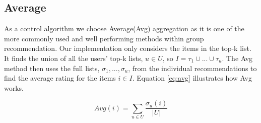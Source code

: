 \subsection{Average}\label{sec:average}
As a control algorithm we choose Average(Avg) aggregation as it is one of the more commonly used and well performing methods within group recommendation\cite{recbook:average}. Our implementation only considers the items in the top-k list. It finds the union of all the users' top-k lists, $u \in U$, so $I = \tau_1 \cup ... \cup \tau_u$. The Avg method then uses the full lists, $\sigma_1, ..., \sigma_u$, from the individual recommendations to find the average rating for the items $i \in I$. Equation \ref{eq:avg} illustrates how Avg works.

\begin{equation}\label{eq:avg}
Avg(i) = \sum_{u \in U}\frac{\sigma_u(i)}{|U|} 
\end{equation}